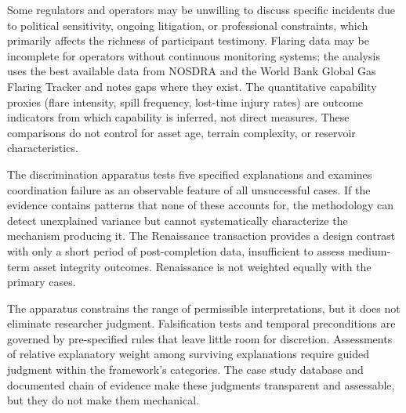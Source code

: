 Some regulators and operators may be unwilling to discuss specific
incidents due to political sensitivity, ongoing litigation, or
professional constraints, which primarily affects the richness of
participant testimony. Flaring data may be incomplete for operators
without continuous monitoring systems; the analysis uses the best
available data from NOSDRA and the World Bank Global Gas Flaring Tracker
and notes gaps where they exist. The quantitative capability proxies
(flare intensity, spill frequency, lost-time injury rates) are outcome
indicators from which capability is inferred, not direct measures. These
comparisons do not control for asset age, terrain complexity, or
reservoir characteristics.

The discrimination apparatus tests five specified explanations and
examines coordination failure as an observable feature of all
unsuccessful cases. If the evidence contains patterns that none of these
accounts for, the methodology can detect unexplained variance but cannot
systematically characterize the mechanism producing it. The Renaissance
transaction provides a design contrast with only a short period of
post-completion data, insufficient to assess medium-term asset integrity
outcomes. Renaissance is not weighted equally with the primary cases.

The apparatus constrains the range of permissible interpretations, but
it does not eliminate researcher judgment. Falsification tests and
temporal preconditions are governed by pre-specified rules that leave
little room for discretion. Assessments of relative explanatory weight
among surviving explanations require guided judgment within the
framework's categories. The case study database and documented chain of
evidence make these judgments transparent and assessable, but they do
not make them mechanical.
